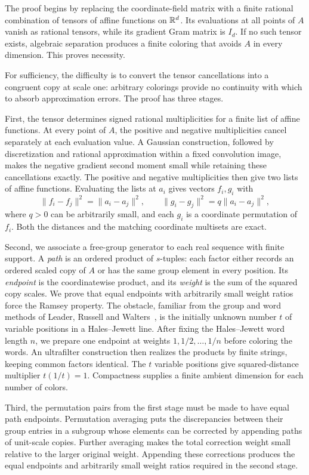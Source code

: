 The proof begins by replacing the coordinate-field matrix with a
finite rational combination of tensors of affine functions on
$\mathbb R^d$. Its evaluations at all points of $A$ vanish as rational
tensors, while its gradient Gram matrix is $I_d$.
If no such tensor exists, algebraic separation produces a finite
coloring that avoids $A$ in every dimension. This proves necessity.

For sufficiency, the difficulty is to convert the tensor cancellations
into a congruent copy at scale one: arbitrary colorings provide no
continuity with which to absorb approximation errors. The proof has
three stages.

First, the tensor determines signed rational multiplicities for a
finite list of affine functions. At every point of $A$, the positive
and negative multiplicities cancel separately at each evaluation
value. A Gaussian construction, followed by discretization and rational
approximation within a fixed convolution image, makes the negative
gradient second moment small while retaining these cancellations
exactly. The positive and negative multiplicities then give two lists
of affine functions. Evaluating the lists at $a_i$ gives vectors
$f_i,g_i$ with
\[
 \|f_i-f_j\|^2=\|a_i-a_j\|^2,\qquad
 \|g_i-g_j\|^2=q\|a_i-a_j\|^2,
\]
where $q>0$ can be arbitrarily small, and each $g_i$ is a coordinate
permutation of $f_i$. Both the distances and the matching coordinate
multisets are exact.

Second, we associate a free-group generator to each real sequence with
finite support. A \emph{path} is an ordered product of $s$-tuples:
each factor either records an ordered scaled copy of $A$ or has the
same group element in every position. Its \emph{endpoint} is the
coordinatewise product, and its \emph{weight} is the sum of the squared
copy scales. We prove that equal endpoints with arbitrarily small
weight ratios force the Ramsey property. The obstacle, familiar from
the group and word methods of Leader, Russell and
Walters~\cite[Sections~2--3]{lrw-transitive}, is the initially unknown
number $t$ of variable positions in a Hales--Jewett line. After fixing
the Hales--Jewett word length $n$, we prepare one endpoint at weights
$1,1/2,\ldots,1/n$ before coloring the words.
An ultrafilter construction then realizes the products by finite
strings, keeping common factors identical. The $t$ variable positions
give squared-distance multiplier $t(1/t)=1$. Compactness supplies a
finite ambient dimension for each number of colors.

Third, the permutation pairs from the first stage must be made to have
equal path endpoints. Permutation averaging puts the discrepancies
between their group entries in a subgroup whose elements can be
corrected by appending paths of unit-scale copies. Further averaging
makes the total correction weight small relative to the larger
original weight. Appending these corrections produces the equal
endpoints and arbitrarily small weight ratios required in the second
stage.

